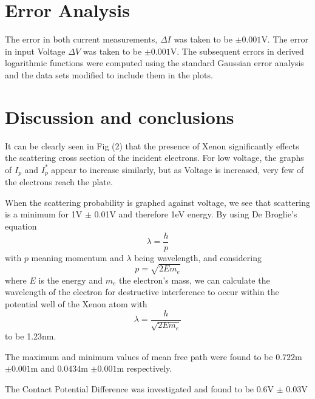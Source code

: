 \documentclass{article}
\begin{document}
\section*{Error Analysis}
The error in both current measurements, $\Delta I$ was taken to be $\pm 0.001$V. The error in input Voltage $\Delta V$ was taken to be $\pm 0.001$V. The subsequent errors in derived logarithmic functions were computed using the standard Gaussian error analysis and the data sets modified to include them in the plots.

\section*{Discussion and conclusions}
It can be clearly seen in Fig (2) that the presence of Xenon significantly effects the scattering cross section of the incident electrons. For low voltage, the graphs of $I_p$ and $I_p^*$ appear to increase similarly, but as Voltage is increased, very few of the electrons reach the plate.

When the scattering probability is graphed against voltage, we see that scattering is a minimum for 1V $\pm$ 0.01V and therefore 1eV energy. By using De Broglie's equation \[\lambda = \frac{h}{p}\] with $p$ meaning momentum and $\lambda$ being wavelength, and considering \[p = \sqrt{2Em_e}\] where $E$ is the energy and $m_e$ the electron's mass, we can calculate the wavelength of the electron for destructive interference to occur within the potential well of the Xenon atom with \[\lambda = \frac{h}{\sqrt{2Em_e}}\] to be 1.23nm.

The maximum and minimum values of mean free path were found to be $0.722$m $\pm0.001$m and $0.0434$m $\pm0.001$m respectively.

The Contact Potential Difference was investigated and found to be 0.6V $\pm$ 0.03V
\end{document}
